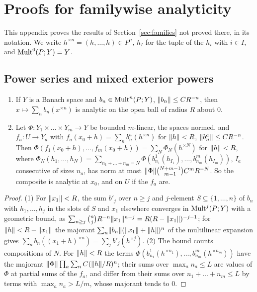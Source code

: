 \section{Proofs for familywise analyticity}\label{app:families}

This appendix proves the results of Section~\ref{sec:families} not proved there, in its notation. We write
$h^{\times n}=(h,\dots,h)\in P^n$, $h_I$ for the tuple of the $h_i$ with $i\in I$, and $\operatorname{Mult}^0(P;Y)=Y$.

\subsection{Power series and mixed exterior powers}\label{fmo:ssec:tools}

\begin{lemma}\label{fmo:lem:series}
\begin{enumerate}
\item If $Y$ is a Banach space and $b_n\in\operatorname{Mult}^n(P;Y)$, $\lVert b_n\rVert\le CR^{-n}$, then $x\mapsto\sum_nb_n(x^{\times n})$ is
analytic on the open ball of radius $R$ about $0$.
\item Let $\Phi\colon Y_1\times\dots\times Y_m\to Y$ be bounded $m$-linear, the spaces normed, and $f_a\colon U\to Y_a$ with
$f_a(x_0+h)=\sum_nb^a_n(h^{\times n})$ for $\lVert h\rVert<R$, $\lVert b^a_n\rVert\le CR^{-n}$. Then
$\Phi(f_1(x_0+h),\allowbreak\dots,f_m(x_0+h))=
\sum_N\Phi_N(h^{\times N})$ for $\lVert h\rVert<R$, where
$\Phi_N(h_1,\dots,h_N)=\sum_{n_1+\dots+n_m=N}\Phi(b^1_{n_1}(h_{I_1}),\allowbreak\dots,
b^m_{n_m}(h_{I_m}))$, $I_a$ consecutive of sizes $n_a$, has norm at most $\lVert \Phi\rVert\binom{N+m-1}{m-1}C^mR^{-N}$. So the
composite is analytic at $x_0$, and on $U$ if the $f_a$ are.
\end{enumerate}
\end{lemma}

\begin{proof}
(1) For $\lVert x_1\rVert<R$, the sum $b'_j$ over $n\ge j$ and $j$-element $S\subseteq\{1,\dots,n\}$ of $b_n$ with
$h_1,\dots,h_j$ in the slots of $S$ and $x_1$ elsewhere converges in $\operatorname{Mult}^j(P;Y)$ with a geometric bound, as
$\sum_{n\ge j}\binom njR^{-n}\lVert x_1\rVert^{n-j}=R(R-\lVert x_1\rVert)^{-j-1}$; for $\lVert h\rVert<R-\lVert x_1\rVert$ the majorant
$\sum_n\lVert b_n\rVert(\lVert x_1\rVert+\lVert h\rVert)^n$ of the multilinear expansion gives $\sum_nb_n((x_1+h)^{\times n})=
\sum_jb'_j(h^{\times j})$.
(2) The bound counts compositions of $N$. For $\lVert h\rVert<R$ the terms $\Phi(b^1_{n_1}(h^{\times n_1}),\dots,b^m_{n_m}(h^{\times
n_m}))$ have the majorant $\lVert \Phi\rVert\prod_a\sum_nC(\lVert h\rVert/R)^n$; their sums over $\max_an_a\le L$ are values of $\Phi$ at
partial sums of the $f_a$, and differ from their sums over $n_1+\dots+n_m\le L$ by terms with $\max_an_a>L/m$, whose
majorant tends to $0$.
\end{proof}

